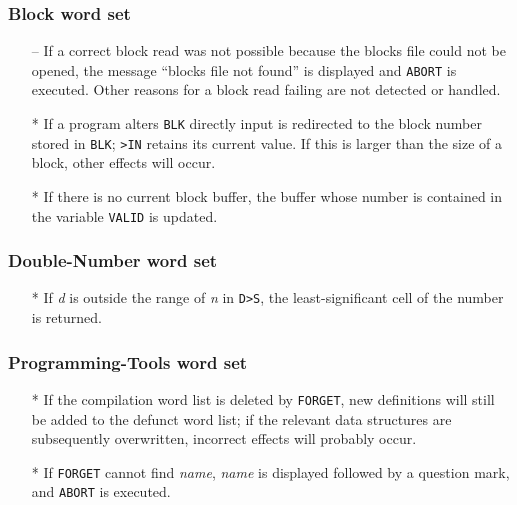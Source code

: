 \documentclass[english]{article}
\newcommand{\spic}[1]{{\it #1\/}}
\begin{document}
\subsubsection{Block word set}

\begin{itemize}
\item[--]If a correct block read was not possible because the blocks file could not be opened, the message ``blocks file not found'' is displayed and {\tt ABORT} is executed. Other reasons for a block read failing are not detected or handled.
\item[*]If a program alters {\tt BLK} directly input is redirected to the block number stored in {\tt BLK}; {\tt >IN} retains its current value. If this is larger than the size of a block, other effects will occur.
\item[*]If there is no current block buffer, the buffer whose number is contained in the variable {\tt VALID} is updated.
\end{itemize}

\subsubsection{Double-Number word set}

\begin{itemize}
\item[*]If \spic{d} is outside the range of \spic{n} in {\tt D>S}, the least-significant cell of the number is returned.
\end{itemize}

\subsubsection{Programming-Tools word set}

\begin{itemize}
\item[*]If the compilation word list is deleted by {\tt FORGET}, new definitions will still be added to the defunct word list; if the relevant data structures are subsequently overwritten, incorrect effects will probably occur.
\item[*]If {\tt FORGET} cannot find \textit{name}, \textit{name} is displayed followed by a question mark, and {\tt ABORT} is executed.
\end{itemize}
\end{document}
